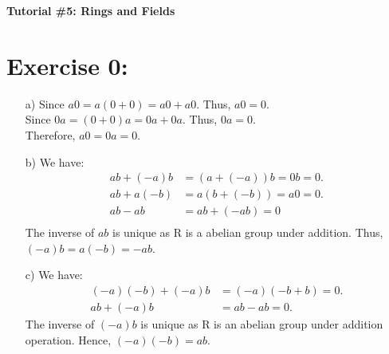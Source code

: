 \documentclass{article}
\begin{document}
	\centering
	\LARGE\textbf{Tutorial \#5: Rings and Fields}\\
	
	\justify\Large
	
	\section{Exercise 0:}
		\begin{enumerate}
			\item [a)]
				Since $a0 = a(0+0) = a0 + a0$. Thus, $a0 = 0$.\\
				Since $0a = (0 + 0)a = 0a + 0a$. Thus, $0a = 0$.\\
				Therefore, $a0 = 0a = 0$.
			\item [b)]
				We have:
					\begin{align*}
						ab + (-a)b &= (a + (-a))b = 0b = 0.\\
						ab + a(-b) &= a(b + (-b)) = a0 = 0.\\
						ab - ab &= ab + (-ab) = 0\\						
					\end{align*}
				The inverse of $ab$ is unique as R is a abelian group under addition. Thus, $(-a)b = a(-b) = -ab$.
			\item [c)]
				We have:
					\begin{align*}
						(-a)(-b) + (-a)b &= (-a)(-b + b) = 0.\\
						ab + (-a)b &= ab - ab = 0.
					\end{align*}
				The inverse of $(-a)b$ is unique as R is an abelian group under addition operation. Hence, $(-a)(-b) = ab$.
		\end{enumerate}
	
\end{document}
